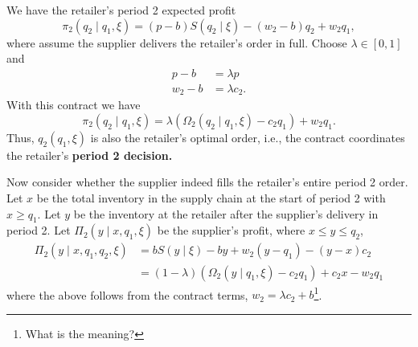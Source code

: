 We have the retailer's period 2 expected profit
\begin{equation*}
    \pi_2(q_2\mid q_1,\xi)=(p-b)S(q_2\mid \xi)-(w_2-b)q_2+w_2 q_1,
\end{equation*}
where assume the supplier delivers the retailer's order in full. Choose $\lambda\in[0,1]$ and 
\begin{align*}
    p-b&=\lambda p\\
    w_2-b&=\lambda c_2.
\end{align*}
With this contract we have 
\begin{equation*}
    \pi_2(q_2\mid q_1,\xi)=\lambda(\Omega_2(q_2\mid q_1,\xi)-c_2 q_1)+w_2 q_1.
\end{equation*}
Thus, $q_2(q_1,\xi)$ is also the retailer's optimal order, i.e., the contract coordinates the retailer's \textbf{period 2 decision.}

Now consider whether the supplier indeed fills the retailer's entire period 2 order. Let $x$ be the total inventory in the supply chain at the start of period 2 with $x\geq q_1$. Let $y$ be the inventory at the retailer after the supplier's delivery in period 2. Let $\Pi_2(y\mid x, q_1,\xi)$ be the supplier's profit, where $x\leq y\leq q_2$,
\begin{align*}
    \Pi_2(y\mid x,q_1,q_2,\xi)&=b S(y\mid\xi)-by+w_2(y-q_1)-(y-x)c_2\\
    &=(1-\lambda)(\Omega_2(y\mid q_1,\xi)-c_2 q_1)+c_2 x- w_2 q_1
\end{align*}
where the above follows from the contract terms, $w_2=\lambda c_2+b$\footnote{What is the meaning?}. 






